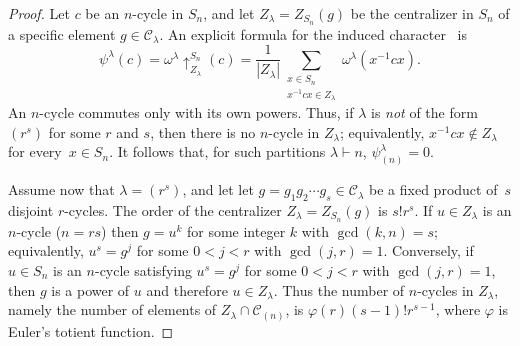 \documentclass[ALCO,published]{cedram}
\newcommand{\C}{\mathcal C}
\def\x#1{(\textnormal{mod}\ x^{#1})}
\begin{document}
\begin{proof}
    Let $c$ be an $n$-cycle in $S_n$, and let  $Z_\lambda = Z_{S_n}(g)$ be the centralizer in $S_n$ of a specific element $g\in \C_\lambda$. 
    An explicit formula for the induced character~\cite[(5.1)]{Isaacs} is
    \[
        \psi^\lambda(c)=\omega^\lambda\uparrow_{Z_\lambda}^{S_n}(c)=\frac{1}{|Z_\lambda|}\sum_{\substack{x\in S_n\\x^{-1}cx\in Z_\lambda}}\omega^\lambda(x^{-1}cx).
    \]
    An $n$-cycle commutes only with its own powers. Thus, if $\lambda$ is {\em not} of the form $(r^s)$ for some $r$ and $s$, 
    then there is no $n$-cycle in $Z_\lambda$;
    equivalently, $x^{-1}cx \not\in Z_\lambda$ for every~$x\in S_n$. 
    It follows that, for such partitions $\lambda \vdash n$, $\psi^\lambda_{(n)}=0$.

    Assume now that $\lambda= (r^s)$, and let let $g = g_1 g_2 \cdots g_s \in \C_\lambda$ be a fixed  product of~$s$ disjoint $r$-cycles. 
    The order of the centralizer 
    $Z_\lambda = Z_{S_n}(g)$ is $s!r^s$. 
    If $u \in Z_\lambda$ is an $n$-cycle ($n = rs$) then 
    $g = u^k$ for some integer $k$ with $\gcd(k,n) = s$;
    equivalently, $u^s = g^j$ for some $0 < j < r$ with $\gcd(j,r) = 1$.
    Conversely, if $u \in S_n$ is an $n$-cycle satisfying 
    $u^s = g^j$ for some $0 < j < r$ with $\gcd(j,r) = 1$, then $g$ is a power of $u$ and therefore $u \in Z_\lambda$.
    Thus the number of $n$-cycles in $Z_\lambda$, namely the number of elements of $Z_\lambda \cap \C_{(n)}$, is $\varphi(r) (s-1)! r^{s-1}$, where $\varphi$ is Euler's totient function. 


\end{proof}
\end{document}
